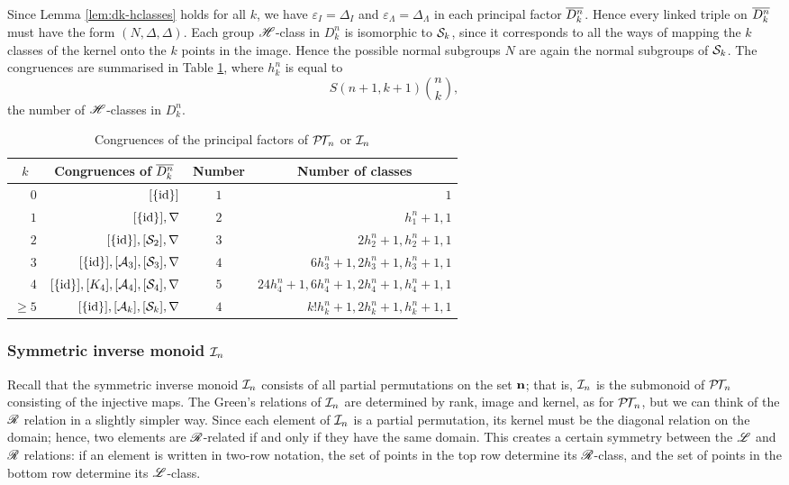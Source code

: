 Since Lemma \ref{lem:dk-hclasses} holds for all $k$, we have
$\varepsilon_I = \Delta_I$ and $\varepsilon_\Lambda = \Delta_\Lambda$ in each
principal factor $\overline{D_k^n}$.  Hence every linked triple on $\overline{D_k^n}$ must
have the form $(N, \Delta, \Delta)$.  Each group $\mathrel{\mathscr{H}}$-class in $D_k^n$ is
isomorphic to $\mathcal{S}_k$, since it corresponds to all the ways of mapping the
$k$ classes of the kernel onto the $k$ points in the image.  Hence the possible
normal subgroups $N$ are again the normal subgroups of $\mathcal{S}_k$.
The congruences are summarised in Table \ref{tab:dkstar-congs-ptn}, where
$h_k^n$ is equal to $$S(n+1, k+1) \binom{n}{k},$$ the number of $\mathrel{\mathscr{H}}$-classes in
$D_k^n$.

\begin{table}[ht]
  \centering
  \renewcommand{\arraystretch}{1.3}
  \begin{tabular}{| r | r | c | r |}
    \hline
    \multicolumn{1}{|c|}{$k$} & \multicolumn{1}{c|}{\textbf{Congruences of $\overline{D_k^n}$}} & \textbf{Number} & \multicolumn{1}{c|}{\textbf{Number of classes}} \\
    \hline
    $0$ & $[\{\operatorname{id}\}]$ & $1$ & $1$ \\
    $1$ & $[\{\operatorname{id}\}], \nabla$ & $2$ & $h_1^n+1, 1$ \\
    $2$ & $[\{\operatorname{id}\}], [\mathcal{S}_2], \nabla$ & $3$ & $2h_2^n+1, h_2^n+1, 1$ \\
    $3$ & $[\{\operatorname{id}\}], [\mathcal{A}_3], [\mathcal{S}_3], \nabla$ & $4$ & $6h_3^n+1, 2h_3^n+1, h_3^n+1, 1$ \\
    $4$ & $[\{\operatorname{id}\}], [K_4], [\mathcal{A}_4], [\mathcal{S}_4], \nabla$ & $5$ & $24h_4^n+1, 6h_4^n+1, 2h_4^n+1, h_4^n+1, 1$ \\
    $\geq 5$ & $[\{\operatorname{id}\}], [\mathcal{A}_k], [\mathcal{S}_k], \nabla$ & $4$ & $k!h_k^n+1, 2h_k^n+1, h_k^n+1, 1$ \\
    \hline
  \end{tabular}
  \caption{Congruences of the principal factors of $\mathcal{P\!T\!}_n$ or
    $\mathcal{I}_n$}
  \label{tab:dkstar-congs-ptn}
\end{table}

\subsubsection{Symmetric inverse monoid $\mathcal{I}_n$}
\label{sec:princfact-in}
Recall that the symmetric inverse monoid $\mathcal{I}_n$ consists of all partial
permutations on the set $\mathbf{n}$; that is, $\mathcal{I}_n$ is the submonoid of $\mathcal{P\!T\!}_n$
consisting of the injective maps.  The Green's relations of $\mathcal{I}_n$ are
determined by rank, image and kernel, as for $\mathcal{P\!T\!}_n$, but we can think of the
$\mathrel{\mathscr{R}}$ relation in a slightly simpler way.  Since each element of $\mathcal{I}_n$ is a
partial permutation, its kernel must be the diagonal relation on the domain;
hence, two elements are $\mathrel{\mathscr{R}}$-related if and only if they have the same domain.
This creates a certain symmetry between the $\mathrel{\mathscr{L}}$ and $\mathrel{\mathscr{R}}$ relations: if an
element is written in two-row notation, the set of points in the top row
determine its $\mathrel{\mathscr{R}}$-class, and the set of points in the bottom row determine its
$\mathrel{\mathscr{L}}$-class.

